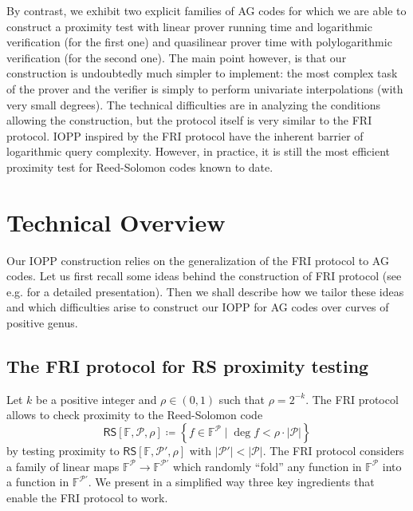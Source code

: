 \documentclass[a4paper,USenglish,autoref]{lipics-v2021}
\newcommand\F{\mathbb{F}}
\newcommand\RS[1]{\mathsf{RS}\left[\F,#1\right]}
\newcommand{\set}[1]{\left\{#1\right\}}
\newcommand{\size}[1]{\left|#1\right|}
\newcommand\calP{\mathcal{P}}
\newcommand\mydef{\coloneqq}
\newcommand{\cd}{\cdot}
\begin{document}
By contrast, we exhibit two explicit families of AG codes for which we are able to construct a proximity test with linear prover running time and logarithmic verification (for the first one) and quasilinear prover time with polylogarithmic verification (for the second one). The main point however, is that our construction is undoubtedly much simpler to implement: the most complex task of the prover and the verifier is simply to perform univariate interpolations (with very small degrees). The technical difficulties are in analyzing the conditions allowing the construction, but the protocol itself is very similar to the \textsf{FRI} protocol. IOPP inspired by the \textsf{FRI} protocol have the inherent barrier of logarithmic query complexity. However, in practice, it is still the most efficient proximity test for Reed-Solomon codes known to date.

\section{Technical Overview}

Our IOPP construction relies on the generalization of the \textsf{FRI} protocol to AG codes. Let us first recall some ideas behind the construction of \textsf{FRI} protocol (see e.g. \cite{BKS18} for a detailed presentation). Then we shall describe how we tailor these ideas and which difficulties arise to construct our IOPP for AG codes over curves of positive genus.

\subsection{The \textsf{FRI} protocol for RS proximity testing}

Let $k$ be a positive integer and $\rho \in (0,1)$ such that $\rho = 2^{-k}$. The \textsf{FRI} protocol allows to check proximity to the Reed-Solomon code \[\RS{\calP,\rho} \mydef \set{f \in \F^\calP \mid \deg f < \rho \cd \size{\calP}}\] by testing proximity to $\RS{\calP',\rho}$ with $\size{\calP'}<\size{\calP}$. The \textsf{FRI} protocol considers a family of linear maps $\F^{\calP} \rightarrow \F^{\calP'}$ which randomly ``fold'' any function in $\F^{\calP}$ into a function in $\F^{\calP'}$. We present in a simplified way three key ingredients that enable the \textsf{FRI} protocol to work.
\end{document}
